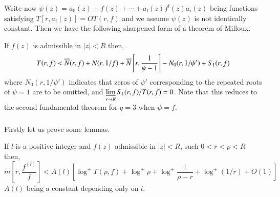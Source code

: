 Write now $\psi(z)=a_{0}(z)+f(z)+\cdots+a_{l}(z)f^{l}(z)a_{i}(z)$
being functions satisfying $T[r,a_{i}(z)]=OT(r,f)$ and we assume
$\psi(z)$ is not identically constant. Then we have the following
sharpened form of a theorem of Milloux.

\begin{thm}\label{part2-thm13}
If $f(z)$ is admissible in $|z|<R$ then,
$$
T(r,f)<\overline{N}(r,f)+N(r,1/f)+\overline{N}\left[r,\frac{1}{\psi-1}\right]-N_{0}(r,1/\psi')+S_{1}(r,f) 
$$
where $N_{0}(r,1/\psi')$ indicates that zeros of $\psi'$ corresponding
to the repeated roots of $\psi=1$ are to be omitted, and
$\mathop{\underline{\lim}}\limits_{r\to R}S_{1}(r,f)/T(r,f)=0$. Note that this
reduces to the second fundamental theorem for $q=3$ when $\psi=f$.
\end{thm}

\subsubsection{}\label{part2-subsubsec2.5.1}\pageoriginale

Firstly let us prove some lemmas.

\begin{lem}\label{part2-lem5}
If $l$ is a positive integer and $f(z)$ admissible in $|z|<R$, such
$0<r<\rho<R$ then,
{\fontsize{9}{11}\selectfont
$$
m\left[r,\frac{f^{(l)}}{f}\right]<A(l)\left[\log^{+}T(\rho,f)+\log^{+}\rho+\log^{+}\frac{1}{\rho-r}+\log^{+}(1/r)+O(1)\right] 
$$}
$A(l)$ being a constant depending only on $l$.
\end{lem}

